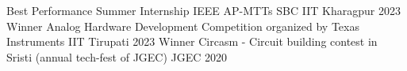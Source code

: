 
\begin{cvhonors}

  \cvhonor
    {Best Performance} %
    {Summer Internship} %
    {IEEE AP-MTTs SBC IIT Kharagpur} %
    {2023} %
  \cvhonor
    {Winner} %
    {Analog Hardware Development Competition organized by Texas Instruments} %
    {IIT Tirupati} %
    {2023} %
  \cvhonor
    {Winner} %
    {Circasm - Circuit building contest in Sristi (annual tech-fest of JGEC)} %
    {JGEC} %
    {2020} %
\end{cvhonors}